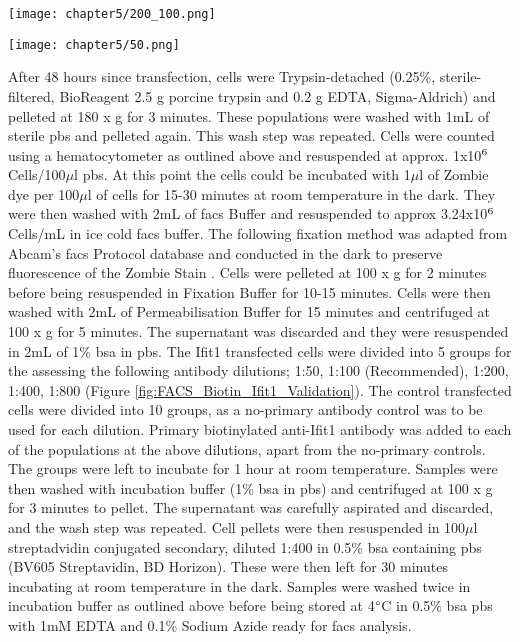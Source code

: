 \begin{figure*}[!htbp]
\ContinuedFloat 
\centering
\texttt{[image: chapter5/200\_100.png]}
\caption[FACS Validation of Anti-Ifit1 Dilutions (1:200 \& 1:100)]{FACS Validation of Dilutions for Biotinylated Anti-Ifit1 Antibody}
\label{fig:FACS_Biotin_Ifit1_Validation}
\end{figure*}

\begin{figure*}[!htbp]
\ContinuedFloat 
\centering
\texttt{[image: chapter5/50.png]}
\caption[FACS Validation of Anti-Ifit1 Dilutions (1:50)]{FACS Validation of Dilutions for Biotinylated Anti-Ifit1 Antibody}
\label{fig:FACS_Biotin_Ifit1_Validation}
\end{figure*}

After 48 hours since transfection, cells were Trypsin-detached (0.25\%, sterile-filtered, BioReagent 2.5 g porcine trypsin and 0.2 g EDTA, Sigma-Aldrich) and pelleted at 180 x g for 3 minutes. These populations were washed with 1mL of sterile \acrshort{pbs} and pelleted again. This wash step was repeated. Cells were counted using a hematocytometer as outlined above and resuspended at approx. 1x10$\textsuperscript{6}$ Cells/100$\mu$l \acrshort{pbs}. At this point the cells could be incubated with 1$\mu$l of Zombie dye per 100$\mu$l of cells for 15-30 minutes at room temperature in the dark. They were then washed with 2mL of \acrshort{facs} Buffer and resuspended to approx 3.24x10$\textsuperscript{6}$ Cells/mL in ice cold \acrshort{facs} buffer. The following fixation method was adapted from Abcam's \acrshort{facs} Protocol database and conducted in the dark to preserve fluorescence of the Zombie Stain \cite{Abcam}. Cells were pelleted at 100 x g for 2 minutes before being resuspended in Fixation Buffer for 10-15 minutes. Cells were then washed with 2mL of Permeabilisation Buffer for 15 minutes and centrifuged at 100 x g for 5 minutes. The supernatant was discarded and they were resuspended in 2mL of 1\% \acrshort{bsa} in \acrshort{pbs}. The Ifit1 transfected cells were divided into 5 groups for the assessing the following antibody dilutions; 1:50, 1:100 (Recommended), 1:200, 1:400, 1:800 (Figure \ref{fig:FACS_Biotin_Ifit1_Validation}). The control transfected cells were divided into 10 groups, as a no-primary antibody control was to be used for each dilution. Primary biotinylated anti-Ifit1 antibody was added to each of the populations at the above dilutions, apart from the no-primary controls. The groups were left to incubate for 1 hour at room temperature. Samples were then washed with incubation buffer (1\% \acrshort{bsa} in \acrshort{pbs}) and centrifuged at 100 x g for 3 minutes to pellet. The supernatant was carefully aspirated and discarded, and the wash step was repeated. Cell pellets were then resuspended in 100$\mu$l streptadvidin conjugated secondary, diluted 1:400 in 0.5\% \acrshort{bsa} containing \acrshort{pbs} (BV605 Streptavidin, BD Horizon). These were then left for 30 minutes incubating at room temperature in the dark. Samples were washed twice in incubation buffer as outlined above before being stored at 4$\degree$C in 0.5\% \acrshort{bsa} \acrshort{pbs} with 1mM EDTA and 0.1\% Sodium Azide ready for \acrshort{facs} analysis. 

